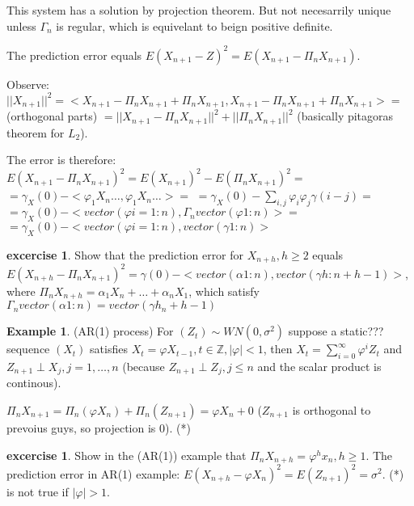 \documentclass[12pt,a4paper]{amsart}
\theoremstyle{definition} %
\newtheorem{example}[defn]{Example}
\newtheorem{excercise}[defn]{excercise}
\theoremstyle{plain} %
\newcommand{\Z}{\mathbb Z}
\begin{document}


This system has a solution by projection theorem. But not necesarrily unique unless $\Gamma_n$ is regular, which is equivelant to beign positive definite. 

The prediction error equals $E(X_{n+1} - Z)^2 = E(X_{n+1 } - \Pi_n X_{n+1})$.

Observe:
$||X_{n+1}||^2  = <X_{n+1} - \Pi_n X_{n+1} + \Pi_n X_{n+1}, X_{n+1} - \Pi_n X_{n+1} + \Pi_n X_{n+1}> = $
(orthogonal parts)
$= ||X_{n+1} - \Pi_n X_{n+1}||^2 + ||\Pi_n X_{n+1}||^2$ (basically pitagoras theorem for $L_2$).

The error is therefore:
$E(X_{n+1} - \Pi_n X_{n+1})^2 = E(X_{n+1})^2 - E(\Pi_n X_{n+1})^2 =$
$= \gamma_X(0) - <\varphi_1 X_n \dots, \varphi_1 X_n \dots> =$
$=\gamma_X(0) - \sum_{i, j} \varphi_i \varphi_j \gamma(i-j) = $
$ = \gamma_X(0) - <vector(\varphi i=1:n), \Gamma_n vector(\varphi 1:n)> = $
$= \gamma_X(0) - <vector(\varphi i=1:n),  vector(\gamma 1:n)> $

\begin{excercise}
Show that the prediction error for $X_{n+h}, h \geq 2$ equals 
$E(X_{n+h}- \Pi_nX_{n+1})^2 = \gamma(0) - <vector(\alpha 1:n), vector(\gamma h:n+h-1)>$,
where $\Pi_n X_{n+h} = \alpha_1 X_n + \dots + \alpha_n X_1$,
which satisfy 
$\Gamma_n vector(\alpha 1:n) = vector(\gamma h_n+h-1)$
\end{excercise}

\begin{example} (AR(1) process)
For $(Z_t) \sim WN(0, \sigma^2)$ suppose a static??? sequence $(X_t)$ satisfies
$X_t = \varphi X_{t-1}, t\in \Z, |\varphi| < 1$, then
$X_t = \sum_{i = 0}^\infty \varphi^i Z_t$ and
$Z_{n+1} \perp X_j, j=1,\dots,n$ (because $Z_{n+1} \perp Z_j, j\leq n$ and the scalar product is continous).

$\Pi_n X_{n+1} = \Pi_n(\varphi X_n) + \Pi_n(Z_{n+1}) = \varphi X_n + 0$ ($Z_{n+1}$ is orthogonal to prevoius guys, so projection is $0$). (*)
\end{example}

\begin{excercise}
Show in the (AR(1)) example that 
$\Pi_n X_{n+h} = \varphi^h x_n, h \geq 1$. The prediction error in AR(1) example:
$E(X_{n+h} - \varphi X_n)^2 = E(Z_{n+1})^2 = \sigma ^2$.
(*) is not true if $|\varphi| > 1$.
\end{excercise}
\end{document}
